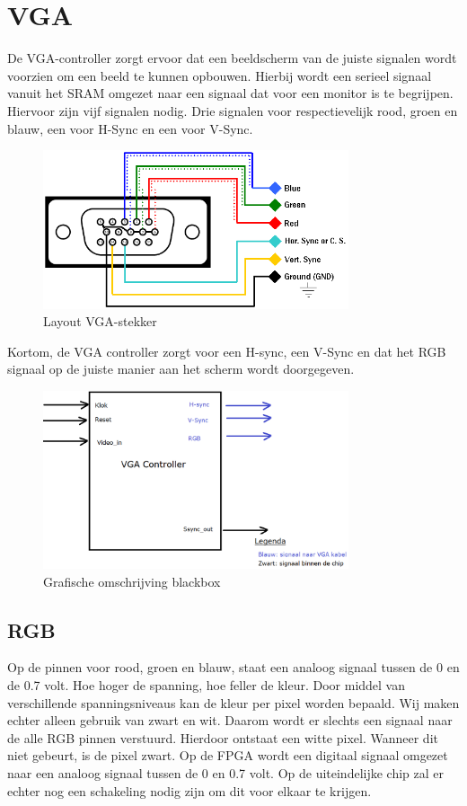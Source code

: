 \documentclass[oneside,dutch]{tudelft-report}
\begin{document}
\chapter{VGA}
De VGA-controller zorgt ervoor dat een beeldscherm van de juiste signalen wordt voorzien om een beeld te kunnen opbouwen. Hierbij wordt een serieel signaal vanuit het SRAM omgezet naar een signaal dat voor een monitor is te begrijpen. Hiervoor zijn vijf signalen nodig. Drie signalen voor respectievelijk rood, groen en blauw, een voor H-Sync en een voor V-Sync. 

\begin{figure}[H]
\center
\includegraphics[width=9cm]{vga2arcade}
\caption{Layout VGA-stekker}
\label{VGA}
\end{figure}

Kortom, de VGA controller zorgt voor een H-sync, een V-Sync en dat het RGB signaal op de juiste manier aan het scherm wordt doorgegeven. 

\begin{figure}[H]
\center
\includegraphics[width=9cm]{totaal-overzicht}
\caption{Grafische omschrijving blackbox}
\label{VGA}
\end{figure}

\section{RGB}
Op de pinnen voor rood, groen en blauw, staat een analoog signaal tussen de 0 en de 0.7 volt. Hoe hoger de spanning, hoe feller de kleur. Door middel van verschillende spanningsniveaus kan de kleur per pixel worden bepaald. Wij maken echter alleen gebruik van zwart en wit. Daarom wordt er slechts een signaal naar de alle RGB pinnen verstuurd. Hierdoor ontstaat een witte pixel. Wanneer dit niet gebeurt, is de pixel zwart. Op de FPGA wordt een digitaal signaal omgezet naar een analoog signaal tussen de 0 en 0.7 volt. Op de uiteindelijke chip zal er echter nog een schakeling nodig zijn om dit voor elkaar te krijgen. 
\end{document}
